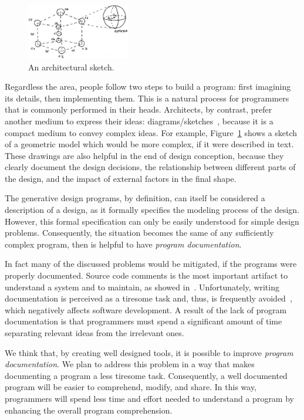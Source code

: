 \begin{figure}
  \vspace{-20pt}
  \begin{center}
    \includegraphics[width=0.4\textwidth]{img/cube-sketch}
  \end{center}
  \vspace{-15pt}
 \caption{An architectural sketch.}  
  \vspace{-20pt}
    \label{fig:sketch}
\end{figure}

Regardless the area, people follow two steps to build a program: first imagining its details, then implementing them. This is a natural process for programmers that is commonly performed in their heads. Architects, by contrast, prefer another medium to express their ideas: diagrams/sketches~\cite{do2001thinking}, because it is a compact medium to convey complex ideas. For example, Figure~\ref{fig:sketch} shows a sketch of a geometric model which would be more complex, if it were described in text. These drawings are also helpful in the end of design conception, because they clearly document the design decisions, the relationship between different parts of the design, and the impact of external factors in the final shape.

The generative design programs, by definition, can itself be considered a description of a design, as it formally specifies the modeling process of the design. However, this formal specification can only be easily understood for simple design problems. Consequently, the situation becomes the same of any sufficiently complex program, then is helpful to have \textit{program documentation}.

In fact many of the discussed problems would be mitigated, if the programs were properly documented. Source code comments is the most important artifact to understand a system and to maintain, as showed in~\cite{de2005study}. Unfortunately, writing documentation is perceived as a tiresome task and, thus, is frequently avoided~\cite{sousa1998survey}, which negatively affects software development. A result of the lack of program documentation is that programmers must spend a significant amount of time separating relevant ideas from the irrelevant ones.

We think that, by creating well designed tools, it is possible to improve \textit{program documentation}. We plan to address this problem in a way that makes documenting a program a less tiresome task. Consequently, a well documented program will be easier to comprehend, modify, and share. In this way, programmers will spend less time and effort needed to understand a program by enhancing the overall program comprehension.
